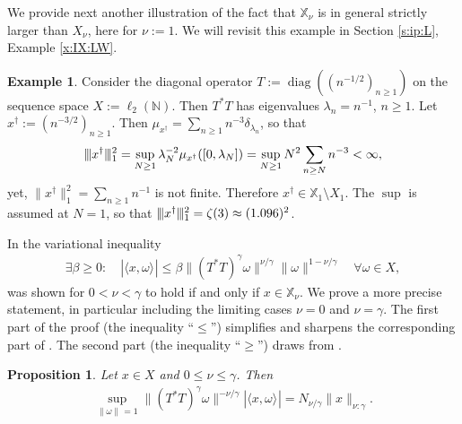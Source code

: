 \documentclass[10pt, a4paper]{iopart}
\newcommand{\IN}{\mathbb{N}}
\newcommand{\IX}{\mathbb{X}}
\newcommand{\norm}[2]{     \| #1       \|_{ #2 }}
\newcommand{\normiii}[2]{\vert\kern-0.25ex\vert\kern-0.25ex\vert #1 \vert\kern-0.25ex \vert\kern-0.25ex\vert_{ #2 }}
\newcommand{\scalar}[2]{     \langle #1       \rangle_{ #2 }}
\newtheorem{proposition}[lemma]{Proposition}
\theoremstyle{remark}
\theoremstyle{definition}
\newtheorem{example}[lemma]{Example}
\begin{document}
%

We provide next another illustration
of the fact that $\IX_\nu$ is in general strictly larger than $X_\nu$,
here for $\nu := 1$.
%
We will revisit this example in Section \ref{s:ip:L}, Example \ref{x:IX:LW}.
%


\begin{example}
\label{x:IX}
	Consider the diagonal operator 
	$T := \mathop{\mathrm{diag}} ((n^{-1/2})_{n \geq 1})$ on
	the sequence space $X := \ell_2(\IN)$.
	Then $T^* T$ has eigenvalues $\lambda_n = n^{-1}$, $n \geq 1$.
	Let $x^\dag := (n^{-3/2})_{n \geq 1}$.
	Then $\mu_{x^\dag} = \sum_{n \geq 1} n^{-3} \delta_{\lambda_n}$,
	so that
	\begin{align}
		\normiii{x^\dag}{1}^2 
		=
		\sup_{N \geq 1}
		\lambda_N^{-2} \mu_{x^\dag}([0, \lambda_N]) 
		= 
		\sup_{N \geq 1}
		N^2
		\sum_{n \geq N} n^{-3}
		< \infty
		,
	\end{align}
	yet,
	$\norm{x^\dag}{1}^2 = \sum_{n \geq 1} n^{-1}$ is not finite.
	Therefore $x^\dag \in \IX_1 \setminus X_1$.
	The $\sup$ is assumed at $N = 1$, 
	so that
	$\normiii{x^\dag}{1}^2 = \zeta(3) \approx (1.096)^2$.
\end{example}

%

\providecommand{\IX}{\mathbb{X}}
In \cite[Proposition 11]{AndreevElbauDeHoopLiuScherzer2015}
the variational inequality
\begin{align}
\label{e:S}
	\exists \beta \geq 0:
	\quad
	| \scalar{ x, \omega }{} |
	\leq
	\beta
	\norm{ (T^* T)^{\gamma} \omega }{}^{\nu / \gamma}
	\norm{ \omega }{}^{1 - \nu / \gamma}
	\quad
	\forall \omega \in X
	,
\end{align}
was shown 
for $0 < \nu < \gamma$
to hold 
if and only if
$x \in \IX_\nu$.
%
%
We prove a more precise statement,
in particular including
the limiting cases $\nu = 0$ and $\nu = \gamma$.
%
The first part of the proof
(the inequality ``$\leq$'')
simplifies and sharpens
the corresponding part of 
\cite[Proof of Proposition 11]{AndreevElbauDeHoopLiuScherzer2015}.
%
The second part (the inequality ``$\geq$'')
draws from \cite{Flemming2012}.
%

%

\begin{proposition}
\label{p:svi}
	Let $x \in X$ and $0 \leq \nu \leq \gamma$.
	Then
	\begin{align}
	\label{e:p:svi}
		\sup_{\norm{\omega}{} = 1}
		\norm{(T^* T)^{\gamma} \omega}{}^{-\nu/\gamma}
		|\scalar{x, \omega}{}|
		=
		N_{\nu / \gamma}
		\norm{x}{\nu:\gamma}
	.
	\end{align}
\end{proposition}
\end{document}
